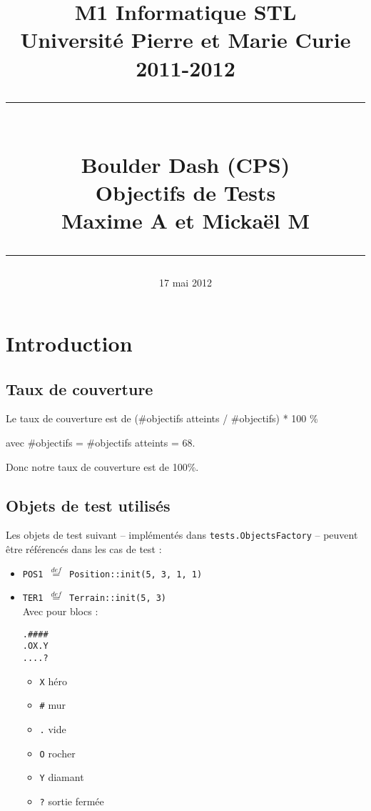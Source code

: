 \documentclass{article}
\title{
	\normalsize{M1 Informatique STL\\
	Université Pierre et Marie Curie\\
	2011-2012}\\
	\vspace{15mm}
	\rule{\linewidth{}}{0.3mm}\\
	\Huge{Boulder Dash (CPS)}\\
	\large{Objectifs de Tests}\\
	\vspace{5mm}
	\footnotesize{Maxime A\bsc{ncelin} et Mickaël M\bsc{enu}}
	\rule{\linewidth{}}{0.3mm}
}
\author{}
\date{17 mai 2012}
\newcommand{\cmd}[1]{\texttt{#1}}
\newcommand{\eqdef}{$\overset{def}{=}$}
\begin{document}
\maketitle{}
\tableofcontents{}
\clearpage{}

\section{Introduction}

\subsection{Taux de couverture}

Le taux de couverture est de (\#objectifs atteints / \#objectifs) * 100 \%

avec \#objectifs = \#objectifs atteints = 68.

Donc notre taux de couverture est de 100\%.

\subsection{Objets de test utilisés}

Les objets de test suivant -- implémentés dans \cmd{tests.ObjectsFactory} -- peuvent être référencés dans les cas de test :

\begin{itemize}
	\item \cmd{POS1 \eqdef{} Position::init(5, 3, 1, 1)}
	\item \cmd{TER1 \eqdef{} Terrain::init(5, 3)}\\

Avec pour blocs :

\begin{verbatim}
.####
.OX.Y
....?

\end{verbatim}

\begin{itemize}
	\item \cmd{X} héro
	\item \cmd{\#} mur
	\item \cmd{.} vide
	\item \cmd{O} rocher
	\item \cmd{Y} diamant
	\item \cmd{?} sortie fermée
\end{itemize}
\end{itemize}


\clearpage{}
\end{document}
